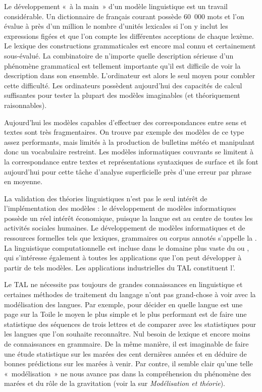 Le développement «~à la main~» d’un modèle linguistique est un travail considérable. Un dictionnaire de français courant possède 60~000 mots et l’on évalue à près d’un million le nombre d’unités lexicales si l’on y inclut les expressions figées et que l’on compte les différentes acceptions de chaque lexème. Le lexique des constructions grammaticales est encore mal connu et certainement sous-évalué. La combinatoire de n’importe quelle description sérieuse d’un phénomène grammatical est tellement importante qu’il est difficile de voir la description dans son ensemble. L’ordinateur est alors le seul moyen pour combler cette difficulté. Les ordinateurs possèdent aujourd’hui des capacités de calcul suffisantes pour tester la plupart des modèles imaginables (et théoriquement raisonnables).

Aujourd’hui les modèles capables d’effectuer des correspondances entre sens et textes sont très fragmentaires. On trouve par exemple des modèles de ce type assez performants, mais limités à la production de bulletins météo et manipulant donc un vocabulaire restreint. Les modèles informatiques couvrants se limitent à la correspondance entre textes et représentations syntaxiques de surface et ils font aujourd’hui pour cette tâche d’analyse superficielle près d’une erreur par phrase en moyenne.

La validation des théories linguistiques n’est pas le seul intérêt de l’implémentation des modèles : le développement de modèles informatiques possède un réel intérêt économique, puisque la langue est au centre de toutes les activités sociales humaines. Le développement de modèles informatiques et de ressources formelles tels que lexiques, grammaires ou corpus annotés s’appelle la . La linguistique computationnelle est incluse dans le domaine plus vaste du  ou , qui s’intéresse également à toutes les applications que l’on peut développer à partir de tels modèles. Les applications industrielles du TAL constituent l’.

Le TAL ne nécessite pas toujours de grandes connaissances en linguistique et certaines méthodes de traitement du langage n’ont pas grand-chose à voir avec la modélisation des langues. Par exemple, pour décider en quelle langue est une page sur la Toile le moyen le plus simple et le plus performant est de faire une statistique des séquences de trois lettres et de comparer avec les statistiques pour les langues que l’on souhaite reconnaître. Nul besoin de lexique et encore moins de connaissances en grammaire. De la même manière, il est imaginable de faire une étude statistique sur les marées des cent dernières années et en déduire de bonnes prédictions sur les marées à venir. Par contre, il semble clair qu’une telle «~modélisation~» ne nous avance pas dans la compréhension du phénomène des marées et du rôle de la gravitation (voir la  sur \textit{Modélisation et théorie}).

